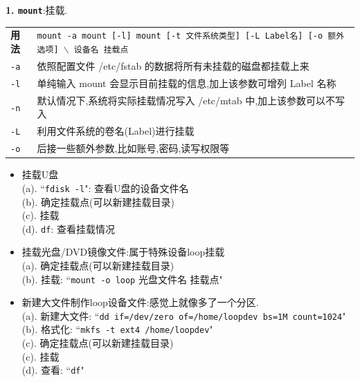 \par
\textbf{1. \texttt{mount}}:挂载.
{\kaishu
\begin{longtable}{l@{: }p{}}\hline\hline
\textbf{用法} & \texttt{mount -a \newline
                mount [-l] \newline
                mount [-t 文件系统类型] [-L Label名] [-o 额外选项] $\backslash$ \newline [-n]  设备名 挂载点} \\

  \texttt{-a} & 依照配置文件 /etc/fstab 的数据将所有未挂载的磁盘都挂载上来 \\

  \texttt{-l} & 单纯输入 mount 会显示目前挂载的信息,加上该参数可增列 Label 名称 \\

  \texttt{-n} & 默认情况下,系统将实际挂载情况写入 /etc/mtab 中,加上该参数可以不写入 \\

  \texttt{-L} & 利用文件系统的卷名(Label)进行挂载 \\

  \texttt{-o} & 后接一些额外参数,比如账号,密码,读写权限等 \\

  \hline
\end{longtable}
}
\begin{itemize}
 \item 挂载U盘 \\
 {\kaishu
    (a). ``\texttt{fdisk -l}": 查看U盘的设备文件名\\
    (b). 确定挂载点(可以新建挂载目录)\\
    (c). 挂载 \\
    (d). \texttt{df}: 查看挂载情况
 }

 \item 挂载光盘/DVD镜像文件:属于特殊设备loop挂载 \\
 {\kaishu
    (a). 确定挂载点(可以新建挂载目录)\\
    (b). 挂载: ``\texttt{mount -o loop} 光盘文件名 挂载点" 
 }

 \item 新建大文件制作loop设备文件:感觉上就像多了一个分区. \\
 {\kaishu
    (a). 新建大文件: ``\texttt{dd if=/dev/zero of=/home/loopdev bs=1M count=1024}" \\
    (b). 格式化: ``\texttt{mkfs -t ext4 /home/loopdev}"\\
    (c). 确定挂载点(可以新建挂载目录)\\
    (c). 挂载 \\
    (d). 查看: ``\texttt{df}"
 }
\end{itemize}

